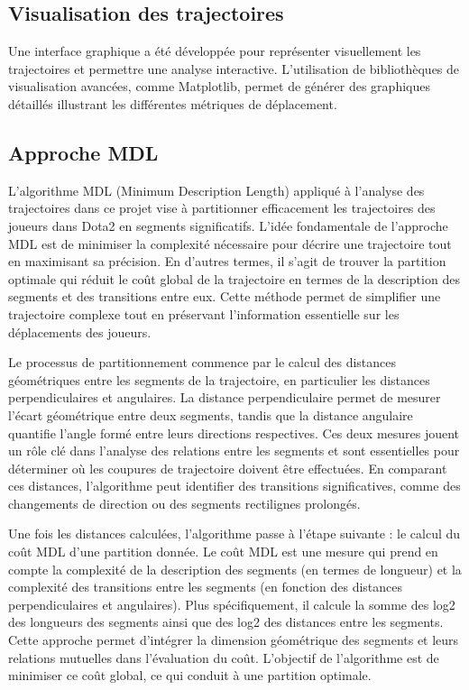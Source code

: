 \documentclass{article}
\begin{document}
        \subsection{Visualisation des trajectoires}
        Une interface graphique a été développée pour représenter visuellement les trajectoires et permettre une analyse interactive. L’utilisation de bibliothèques de visualisation avancées, comme Matplotlib, permet de générer des graphiques détaillés illustrant les différentes métriques de déplacement.

        \subsection{Approche MDL}
        L'algorithme MDL (Minimum Description Length) appliqué à l'analyse des trajectoires dans ce projet vise à partitionner efficacement les trajectoires des joueurs dans Dota2 en segments significatifs. L'idée fondamentale de l'approche MDL est de minimiser la complexité nécessaire pour décrire une trajectoire tout en maximisant sa précision. En d'autres termes, il s'agit de trouver la partition optimale qui réduit le coût global de la trajectoire en termes de la description des segments et des transitions entre eux. Cette méthode permet de simplifier une trajectoire complexe tout en préservant l'information essentielle sur les déplacements des joueurs.

        Le processus de partitionnement commence par le calcul des distances géométriques entre les segments de la trajectoire, en particulier les distances perpendiculaires et angulaires. La distance perpendiculaire permet de mesurer l'écart géométrique entre deux segments, tandis que la distance angulaire quantifie l'angle formé entre leurs directions respectives. Ces deux mesures jouent un rôle clé dans l'analyse des relations entre les segments et sont essentielles pour déterminer où les coupures de trajectoire doivent être effectuées. En comparant ces distances, l'algorithme peut identifier des transitions significatives, comme des changements de direction ou des segments rectilignes prolongés.
        
        Une fois les distances calculées, l'algorithme passe à l'étape suivante : le calcul du coût MDL d'une partition donnée. Le coût MDL est une mesure qui prend en compte la complexité de la description des segments (en termes de longueur) et la complexité des transitions entre les segments (en fonction des distances perpendiculaires et angulaires). Plus spécifiquement, il calcule la somme des log2 des longueurs des segments ainsi que des log2 des distances entre les segments. Cette approche permet d'intégrer la dimension géométrique des segments et leurs relations mutuelles dans l'évaluation du coût. L'objectif de l'algorithme est de minimiser ce coût global, ce qui conduit à une partition optimale.
        
\end{document}
